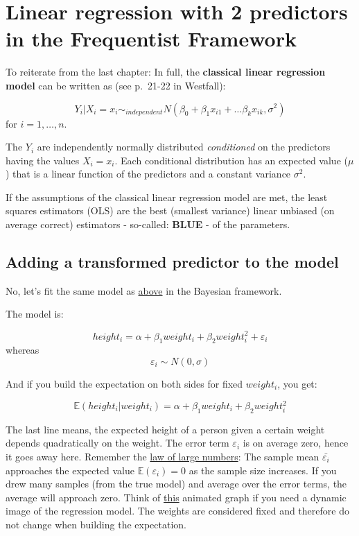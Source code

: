 \documentclass[
]{book}
\begin{document}
\section{Linear regression with 2 predictors in the Frequentist Framework}\label{linear-regression-with-2-predictors-in-the-frequentist-framework}

To reiterate from the last chapter:
In full, the \textbf{classical linear regression model} can be written as
(see p.~21-22 in Westfall):

\[ Y_i|X_i = x_i \sim_{independent} N(\beta_0 + \beta_1 x_{i1} + \dots \beta_k x_{ik},\sigma^2)\]
for \(i = 1, \dots, n\).

The \(Y_i\) are independently normally distributed \emph{conditioned} on the predictors
having the values \(X_i = x_i\). Each conditional distribution has an expected value (\(\mu\))
that is a linear function of the predictors and a constant variance \(\sigma^2\).

If the assumptions of the classical linear regression model are met, the least squares
estimators (OLS) are the best (smallest variance) linear unbiased (on average correct) estimators
- so-called: \textbf{BLUE} - of the parameters.

\subsection{Adding a transformed predictor to the model}\label{adding_transformed_predictor_freq}

No, let's fit the same model as \hyperref[adding_transformed_predictor_bayes]{above} in the Bayesian framework.

The model is:

\[height_i = \alpha + \beta_1 weight_i + \beta_2 weight_i^2 + \varepsilon_i\]
whereas
\[\varepsilon_i \sim N(0, \sigma)\]

And if you build the expectation on both sides for fixed \(weight_i\), you get:

\[\mathbb{E}(height_i|weight_i) = \alpha + \beta_1 weight_i + \beta_2 weight_i^2\]

The last line means, the expected height of a person given a certain weight depends
quadratically on the weight. The error term \(\varepsilon_i\) is on average zero, hence it goes away here.
Remember the \href{https://en.wikipedia.org/wiki/Law_of_large_numbers\#Weak_law}{law of large numbers}:
The sample mean \(\bar{\varepsilon_i}\) approaches the expected value \(\mathbb{E}(\varepsilon_i)=0\)
as the sample size increases. If you drew many samples (from the true model)
and average over the error terms, the average will approach zero.
Think of \href{https://github.com/jdegenfellner/ZHAW_Teaching/blob/main/Wiggle_in_simple_linear_regression.R}{this} animated
graph if you need a dynamic image of the regression model.
The weights are considered fixed and therefore do not change when building the expectation.
\end{document}
